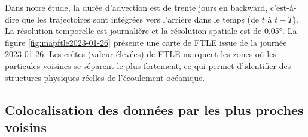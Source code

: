 	 Dans notre étude, la durée d'advection est de trente jours en backward, c'est-à-dire que les trajectoires sont intégrées vers l'arrière dans le temps (de $t$ à $t - T$). La résolution temporelle est journalière et la résolution spatiale est de 0.05°. La figure \ref{fig:mapftle2023-01-26} présente une carte de FTLE issue de la journée 2023-01-26. Les crêtes (valeur élevées) de FTLE marquent les zones où les particules voisines se séparent le plus fortement, ce qui permet d'identifier des structures physiques réelles de l'écoulement océanique.
	 
	 \subsection{Colocalisation des données par les plus proches voisins}
